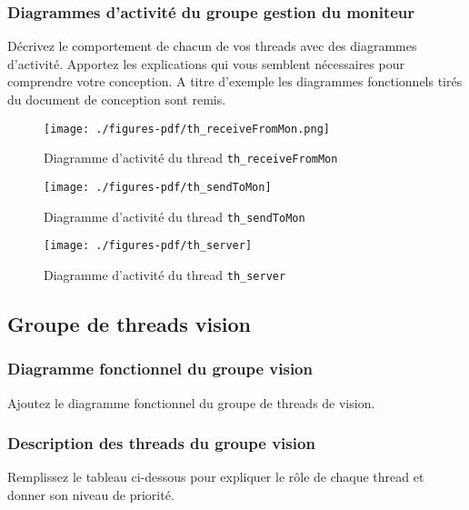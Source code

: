 \documentclass[11pt, a4paper]{paper}
\begin{document}
\subsubsection{Diagrammes d'activité  du groupe gestion du moniteur}
{\color{red}Décrivez le comportement de chacun de vos threads avec des diagrammes d'activité. Apportez les explications qui vous semblent nécessaires pour comprendre votre conception. A titre d'exemple les diagrammes fonctionnels tirés du document de conception sont remis.}

\begin{figure}[htbp]
\label{fig:act_communiquer}
\begin{center}
{\texttt{[image: ./figures-pdf/th\_receiveFromMon.png]}}
{\caption{Diagramme d'activité du thread {\tt th\_receiveFromMon}}}
\end{center}
\end{figure}


\begin{figure}[htbp]
\label{fig:act_envoyerSendToMon}
\begin{center}
{\texttt{[image: ./figures-pdf/th\_sendToMon]}}
{\caption{Diagramme d'activité du thread {\tt th\_sendToMon}}}
\end{center}
\end{figure}


\begin{figure}[htbp]
\label{fig:act_envoyerServer}
\begin{center}
{\texttt{[image: ./figures-pdf/th\_server]}}
{\caption{Diagramme d'activité du thread {\tt th\_server}}}
\end{center}
\end{figure}
\FloatBarrier

\subsection{Groupe de threads vision}

\subsubsection{Diagramme fonctionnel du groupe vision}

{\color{blue} Ajoutez le diagramme fonctionnel du groupe de threads de vision.}

\subsubsection{Description des threads du groupe vision}
{\color{red} Remplissez le tableau ci-dessous pour expliquer le rôle de chaque thread et donner son niveau de priorité.}
\end{document}
